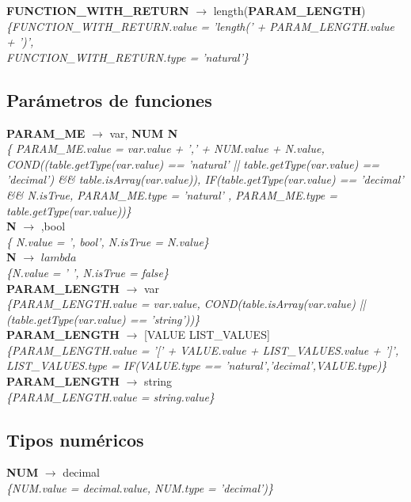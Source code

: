 \documentclass[10pt,a4paper]{article}
\begin{document}
\textbf{FUNCTION\_WITH\_RETURN} $\rightarrow$ length(\textbf{PARAM\_LENGTH}) \\
\textit{\{FUNCTION\_WITH\_RETURN.value =  'length(' + PARAM\_LENGTH.value + ')',\\ 
FUNCTION\_WITH\_RETURN.type = 'natural'\}} \\

\subsection{Parámetros de funciones}
\textbf{PARAM\_ME} $\rightarrow$ var, \textbf{NUM N} \\
\textit{\{ PARAM\_ME.value = var.value + ',' + NUM.value + N.value, COND((table.getType(var.value) == 'natural' || table.getType(var.value) == 'decimal') \&\& table.isArray(var.value)), IF(table.getType(var.value) == 'decimal' \&\& N.isTrue, PARAM\_ME.type = 'natural' , PARAM\_ME.type = table.getType(var.value))\}} \\

\textbf{N} $\rightarrow$ ,bool \\
\textit{\{ N.value = ', bool', N.isTrue = N.value\}} \\ 

\textbf{N} $\rightarrow$ $lambda$  \\
\textit{\{N.value = ' ', N.isTrue = false\}} \\

\textbf{PARAM\_LENGTH} $\rightarrow$ var \\
\textit{\{PARAM\_LENGTH.value = var.value, COND(table.isArray(var.value) || (table.getType(var.value) == 'string'))\}} \\

\textbf{PARAM\_LENGTH} $\rightarrow$ [VALUE LIST\_VALUES]\\
\textit{\{PARAM\_LENGTH.value = '[' + VALUE.value + LIST\_VALUES.value + ']', LIST\_VALUES.type = IF(VALUE.type == 'natural','decimal',VALUE.type)\}} \\

\textbf{PARAM\_LENGTH} $\rightarrow$ string \\
\textit{\{PARAM\_LENGTH.value = string.value\}} \\

\subsection{Tipos numéricos}
\textbf{NUM} $\rightarrow$ decimal \\
\textit{\{NUM.value = decimal.value, NUM.type = 'decimal')\}}  \\ 
\end{document}
